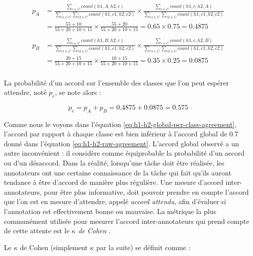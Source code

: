 \documentclass[PhD-Yoann-Dupont.tex]{subfiles}
\begin{document}
\begin{equation}\label{eq:h1-h2-per-class-agreement}
\begin{aligned}
p_{A} &= \frac{\sum_{c \in C} count(h1,A,h2,c)}{\sum_{c1 \in C} \sum_{c2 \in C} count(h1,c1,h2,c2)} \times \frac{\sum_{c \in C} count(h1,c,h2,A)}{\sum_{c1 \in C} \sum_{c2 \in C} count(h1,c1,h2,c2)} \\
      &= \frac{55 + 10}{55 + 20 + 10 + 15} \times \frac{55 + 20}{55 + 20 + 10 + 15} = 0.65 \times 0.75 = 0.4875 \\
\\
p_{B} &= \frac{\sum_{c \in C} count(h1,B,h2,c)}{\sum_{c1 \in C} \sum_{c2 \in C} count(h1,c1,h2,c2)} \times \frac{\sum_{c \in C} count(h1,c,h2,B)}{\sum_{c1 \in C} \sum_{c2 \in C} count(h1,c1,h2,c2)} \\
      &= \frac{20 + 15}{55 + 20 + 10 + 15} \times \frac{10 + 15}{55 + 20 + 10 + 15} = 0.35 \times 0.25 = 0.0875 \\
\end{aligned}
\end{equation}

La probabilité d'un accord sur l'ensemble des classes que l'on peut espérer attendre, noté $p_{e}$, se note alors :

\begin{equation}\label{eq:h1-h2-global-per-class-agreement}
p_{e} = p_{A} + p_{B} = 0.4875 + 0.0875 = 0.575
\end{equation}

Comme nous le voyons dans l'équation \ref{eq:h1-h2-global-per-class-agreement}, l'accord par rapport à chaque classe est bien inférieur à l'accord global de 0.7 donné dans l'équation \ref{eq:h1-h2-raw-agreement}. L'accord global observé a un autre inconvénient : il considère comme équiprobable la probabilité d'un accord ou d'un désaccord. Dans la réalité, lorsqu'une tâche doit être réalisée, les annotateurs ont une certaine connaissance de la tâche qui fait qu'ils auront tendance à être d'accord de manière plus régulière. Une mesure d'accord inter-annotateurs, pour être plus informative, doit pouvoir prendre en compte l'accord que l'on est en mesure d'attendre, appelé \emph{accord attendu}, afin d'évaluer si l'annotation est effectivement bonne ou mauvaise. La métrique la plus communément utilisée pour mesurer l'accord inter-annotateurs qui prend compte de cette attente est le \emph{$\kappa$ de Cohen} \citep{cohen1960coefficient}.

Le $\kappa$ de Cohen (simplement $\kappa$ par la suite) se définit comme :
\end{document}
